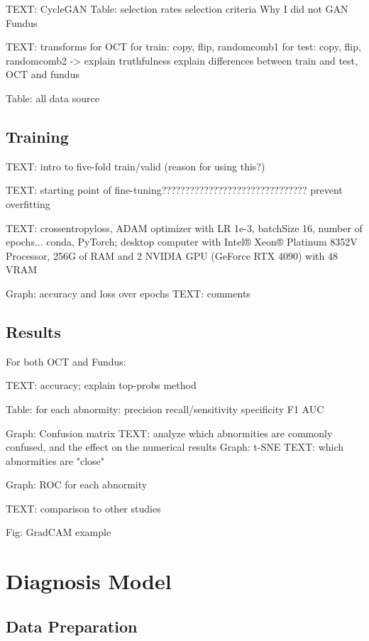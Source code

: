 \documentclass{article}
\begin{document}
			TEXT: CycleGAN
				Table: selection rates
				selection criteria
				Why I did not GAN Fundus
				
			TEXT: transforms for OCT
				for train: copy, flip, randomcomb1
				for test: copy, flip, randomcomb2 -> explain truthfulness
				explain differences between train and test, OCT and fundus

			Table: all data source
			
		\subsection{Training}
			
			TEXT: intro to five-fold train/valid (reason for using this?)
			
			TEXT: starting point of fine-tuning???????????????????????????????
			prevent overfitting
			
			TEXT: crossentropyloss, ADAM optimizer with LR 1e-3, batchSize 16, number of epochs...
			conda, PyTorch;
			desktop computer with Intel® Xeon® Platinum 8352V Processor, 256G of RAM and 2 NVIDIA GPU (GeForce RTX 4090) with 48 VRAM
			
			Graph: accuracy and loss over epochs
			TEXT: comments
			
		\subsection{Results}
			
			For both OCT and Fundus:
			
				TEXT: accuracy; explain top-probs method
				
				Table: for each abnormity:
					precision
					recall/sensitivity
					specificity
					F1
					AUC
					
				Graph: Confusion matrix
				TEXT: analyze which abnormities are commonly confused, and the effect on the numerical results
				Graph: t-SNE
				TEXT: which abnormities are "close"
				
				Graph: ROC for each abnormity
				
				TEXT: comparison to other studies
				
			Fig: GradCAM example
		
	\section{Diagnosis Model}
	
		\subsection{Data Preparation}
		
\end{document}
